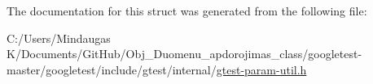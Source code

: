 The documentation for this struct was generated from the following file\+:\begin{DoxyCompactItemize}
\item 
C\+:/\+Users/\+Mindaugas K/\+Documents/\+Git\+Hub/\+Obj\+\_\+\+Duomenu\+\_\+apdorojimas\+\_\+class/googletest-\/master/googletest/include/gtest/internal/\mbox{\hyperlink{googletest-master_2googletest_2include_2gtest_2internal_2gtest-param-util_8h}{gtest-\/param-\/util.\+h}}\end{DoxyCompactItemize}
